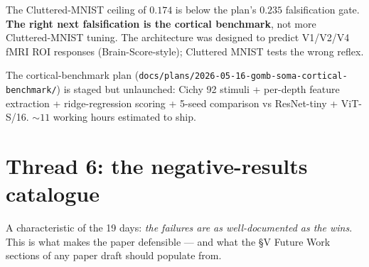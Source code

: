 \documentclass[11pt,a4paper]{article}
\theoremstyle{plain}
\theoremstyle{definition}
\newcommand{\code}[1]{\texttt{\small #1}}
\begin{document}
The Cluttered-MNIST ceiling of $0.174$ is below the plan's $0.235$
falsification gate. \textbf{The right next falsification is the
cortical benchmark}, not more Cluttered-MNIST tuning. The
architecture was designed to predict V1/V2/V4 fMRI ROI responses
(Brain-Score-style); Cluttered MNIST tests the wrong reflex.

The cortical-benchmark plan
(\code{docs/plans/2026-05-16-gomb-soma-cortical-benchmark/}) is
staged but unlaunched: Cichy 92 stimuli + per-depth feature
extraction + ridge-regression scoring + 5-seed comparison vs
ResNet-tiny + ViT-S/16. ${\sim}11$ working hours estimated to ship.

\section{Thread 6: the negative-results catalogue}

A characteristic of the 19 days: \emph{the failures are as
well-documented as the wins}. This is what makes the paper
defensible — and what the §V Future Work sections of any paper draft
should populate from.
\end{document}
